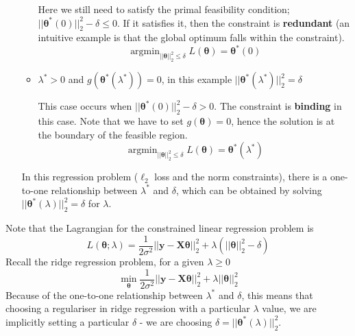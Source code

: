 \documentclass[a4paper, 12pt]{article}
\newcommand{\mat}[1]{\boldsymbol{#1}}
\DeclareMathOperator*{\argmin}{argmin}
\begin{document}
\begin{itemize}
\begin{itemize}
                                Here we still need to satisfy the primal feasibility condition; $|| \mat{\theta^*}(0) ||_2^2 - \delta \leq 0$.
                                If it satisfies it, then the constraint is \textbf{redundant} (an intuitive example is that the global optimum falls within the constraint).
                                $$\argmin_{|| \mat{\theta} ||_2^2 \leq \delta} L(\mat{\theta}) = \mat{\theta^*}(0)$$
                            \item $\lambda^* > 0$ and $g(\mat{\theta^*}(\lambda^*)) = 0$, in this example $|| \mat{\theta^*}(\lambda^*) ||_2^2 = \delta$
                                \smallskip

                                This case occurs when $|| \mat{\theta^*}(0) ||_2^2 - \delta > 0$.
                                The constraint is \textbf{binding} in this case.
                                Note that we have to set $g(\mat{\theta}) = 0$, hence the solution is at the boundary of the feasible region.
                                $$\argmin_{|| \mat{\theta} ||_2^2 \leq \delta} L(\mat{\theta}) = \mat{\theta^*}(\lambda^*)$$
                        \end{itemize}
                        In this regression problem ($\ell_2$ loss and the norm constraints), there is a one-to-one relationship between $\lambda^*$ and $\delta$, which can be obtained by solving $|| \mat{\theta^*}(\lambda) ||_2^2 = \delta$ for $\lambda$.
                \end{itemize}
                Note that the Lagrangian for the constrained linear regression problem is
                $$L(\mat{\theta}; \lambda) = \frac{1}{2 \sigma^2} || \mat{y} - \mat{X}\mat{\theta} ||_2^2 + \lambda(|| \mat{\theta} ||_2^2 - \delta)$$
                Recall the ridge regression problem, for a given $\lambda \geq 0$
                $$\min_{\mat{\theta}} \frac{1}{2\sigma^2} || \mat{y} - \mat{X}\mat{\theta} ||_2^2 + \lambda || \mat{\theta} ||_2^2$$
                Because of the one-to-one relationship between $\lambda^*$ and $\delta$, this means that choosing a regulariser in ridge regression with a particular $\lambda$ value, we are implicitly setting a particular $\delta$ - we are choosing $\delta = || \mat{\theta^*}(\lambda) ||_2^2$.
\end{document}
